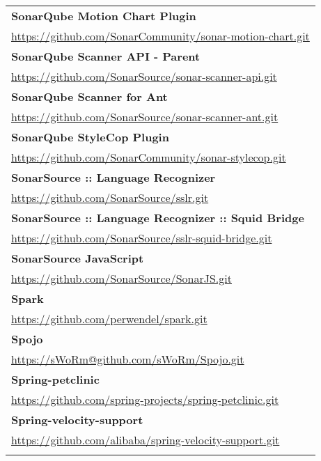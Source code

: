 \begin{table}[]
\small
\begin{tabular}{|p{130mm}|}
\hline 
\bf  SonarQube Motion Chart Plugin                      \\ \url{https://github.com/SonarCommunity/sonar-motion-chart.git}                     \\ \hline \bf
SonarQube Scanner API - Parent                     \\ \url{https://github.com/SonarSource/sonar-scanner-api.git}                         \\ \hline \bf
SonarQube Scanner for Ant                          \\ \url{https://github.com/SonarSource/sonar-scanner-ant.git}                         \\ \hline \bf
SonarQube StyleCop Plugin                          \\ \url{https://github.com/SonarCommunity/sonar-stylecop.git}                         \\ \hline \bf
SonarSource :: Language Recognizer                 \\ \url{https://github.com/SonarSource/sslr.git}                                      \\ \hline \bf 
SonarSource :: Language Recognizer :: Squid Bridge \\ \url{https://github.com/SonarSource/sslr-squid-bridge.git}                         \\ \hline \bf
SonarSource JavaScript                             \\ \url{https://github.com/SonarSource/SonarJS.git}                                   \\ \hline \bf
Spark                                              \\ \url{https://github.com/perwendel/spark.git}                                       \\ \hline \bf
Spojo                                              \\ \url{https://sWoRm@github.com/sWoRm/Spojo.git}                                     \\ \hline \bf
Spring-petclinic                                   \\ \url{https://github.com/spring-projects/spring-petclinic.git}                      \\ \hline \bf
Spring-velocity-support                            \\ \url{https://github.com/alibaba/spring-velocity-support.git}                       \\ \hline \bf

\end{tabular}
\end{table}
